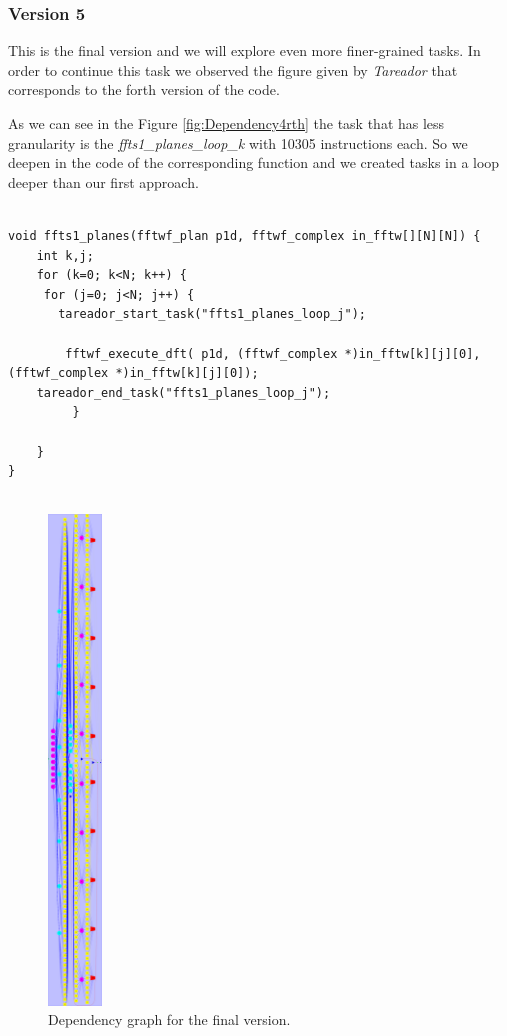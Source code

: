 \documentclass[12]{article}
\begin{document}
\subsubsection{Version 5}
This is the final version and we will explore even more finer-grained tasks. In order to continue this task we observed the figure given by \textit{Tareador} that corresponds to the forth version of the code. 

As we can see in the Figure \ref{fig:Dependency4rth} the task  that has less granularity is the \textit{ffts1\_planes\_loop\_k} with 10305 instructions each. So we deepen in the code of the corresponding function and we created tasks in a loop deeper than our first approach. 
\begin{lstlisting}

void ffts1_planes(fftwf_plan p1d, fftwf_complex in_fftw[][N][N]) {
    int k,j;
    for (k=0; k<N; k++) {
     for (j=0; j<N; j++) {
       tareador_start_task("ffts1_planes_loop_j");

        fftwf_execute_dft( p1d, (fftwf_complex *)in_fftw[k][j][0], (fftwf_complex *)in_fftw[k][j][0]);
    tareador_end_task("ffts1_planes_loop_j");
         }

    }
}


\end{lstlisting}
\bigskip

\begin{figure}[H]
\centering  \includegraphics[width=\linewidth , height=13cm, width=4cm  ]{images/dependency_graph5.png}
  \caption{Dependency graph for the final version.}
  \label{fig:Dependency5}
\end{figure}
\end{document}
